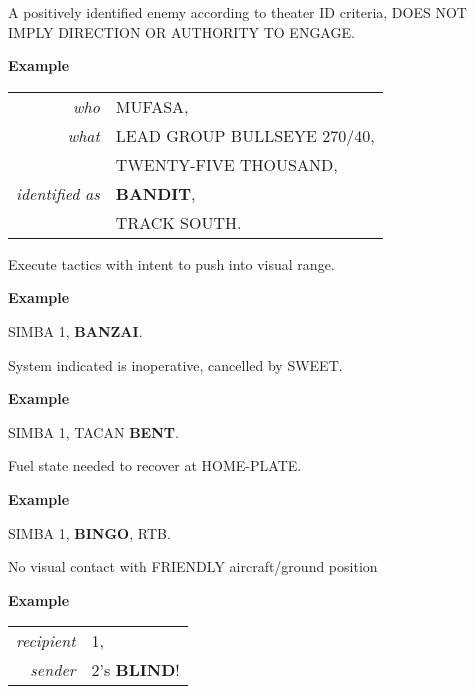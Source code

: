 \begin{tcoloritemize}
    \blueitem[BANDIT]
    A positively identified enemy according to theater ID criteria, DOES NOT IMPLY DIRECTION OR AUTHORITY TO ENGAGE.

    \medskip
    \textbf{Example}
    \begin{center}
        \begin{tabular}{>{\itshape}r l}
            who & MUFASA, \\
            what & LEAD GROUP BULLSEYE 270/40, \\
            & TWENTY-FIVE THOUSAND, \\
            identified as & \textbf{BANDIT}, \\
            & TRACK SOUTH.\\
        \end{tabular}
    \end{center}

    \blueitem[BANZAI]
    Execute tactics with intent to push into visual range.

    \medskip
    \textbf{Example}
    \begin{center}
        \begin{minipage}{0.9\textwidth}
            SIMBA 1, \textbf{BANZAI}.
        \end{minipage}
    \end{center}

    \blueitem[BENT]
    System indicated is inoperative, cancelled by SWEET.

    \medskip
    \textbf{Example}
    \begin{center}
        \begin{minipage}{0.9\textwidth}
            SIMBA 1, TACAN \textbf{BENT}.
        \end{minipage}
    \end{center}

    \blueitem[BINGO]
    Fuel state needed to recover at HOME-PLATE.

    \medskip
    \textbf{Example}
    \begin{center}
        \begin{minipage}{0.9\textwidth}
            SIMBA 1, \textbf{BINGO}, RTB.
        \end{minipage}
    \end{center}

    \blueitem[BLIND]
    No visual contact with FRIENDLY aircraft/ground position

    \medskip
    \textbf{Example}
    \begin{center}
        \begin{tabular}{>{\itshape}r l}
            recipient & 1, \\
            sender & 2's \textbf{BLIND}! \\
        \end{tabular}
    \end{center}


\end{tcoloritemize}
